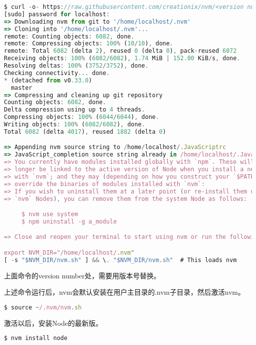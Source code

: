 \begin{lstlisting}[language=JavaScript]
$ curl -o- https://raw.githubusercontent.com/creationix/nvm/<version number>/install.sh | JavaScript
[sudo] password for localhost: 
=> Downloading nvm from git to '/home/localhost/.nvm'
=> Cloning into '/home/localhost/.nvm'...
remote: Counting objects: 6082, done.
remote: Compressing objects: 100% (10/10), done.
remote: Total 6082 (delta 2), reused 0 (delta 0), pack-reused 6072
Receiving objects: 100% (6082/6082), 1.74 MiB | 152.00 KiB/s, done.
Resolving deltas: 100% (3752/3752), done.
Checking connectivity... done.
* (detached from v0.33.0)
  master
=> Compressing and cleaning up git repository
Counting objects: 6082, done.
Delta compression using up to 4 threads.
Compressing objects: 100% (6044/6044), done.
Writing objects: 100% (6082/6082), done.
Total 6082 (delta 4017), reused 1882 (delta 0)

=> Appending nvm source string to /home/localhost/.JavaScriptrc
=> JavaScript_completion source string already in /home/localhost/.JavaScriptrc
=> You currently have modules installed globally with `npm`. These will no
=> longer be linked to the active version of Node when you install a new node
=> with `nvm`; and they may (depending on how you construct your `$PATH`)
=> override the binaries of modules installed with `nvm`:
=> If you wish to uninstall them at a later point (or re-install them under your
=> `nvm` Nodes), you can remove them from the system Node as follows:

     $ nvm use system
     $ npm uninstall -g a_module

=> Close and reopen your terminal to start using nvm or run the following to use it now:

export NVM_DIR="/home/localhost/.nvm"
[ -s "$NVM_DIR/nvm.sh" ] && \. "$NVM_DIR/nvm.sh"  # This loads nvm
\end{lstlisting}



上面命令的version number处，需要用版本号替换。

上述命令运行后，nvm会默认安装在用户主目录的.nvm子目录，然后激活nvm。



\begin{lstlisting}[language=JavaScript]
$ source ~/.nvm/nvm.sh
\end{lstlisting}

激活以后，安装Node的最新版。


\begin{lstlisting}[language=JavaScript]
$ nvm install node
\end{lstlisting}



